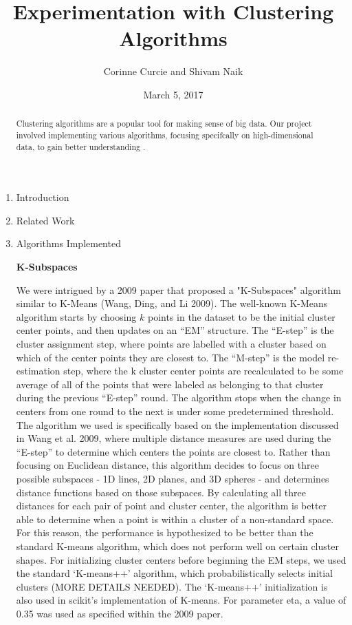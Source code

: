 \documentclass[12pt]{article}
\begin{document}
\title{Experimentation with Clustering Algorithms}

\author{Corinne Curcie and Shivam Naik}
\date{March 5, 2017}

\maketitle

\begin{abstract}
Clustering algorithms are a popular tool for making sense of big data. Our project involved implementing various algorithms, focusing specifcally on high-dimensional data, to gain better understanding . 
\end{abstract}


\begin{enumerate}

\item Introduction

\item Related Work

\item Algorithms Implemented

\textbf{K-Subspaces}

We were intrigued by a 2009 paper that proposed a "K-Subspaces" algorithm similar to K-Means (Wang, Ding, and Li 2009). The well-known K-Means algorithm starts by choosing $k$ points in the dataset to be the initial cluster center points, and then updates on an “EM” structure. The “E-step” is the cluster assignment step, where points are labelled with a cluster based on which of the center points they are closest to. The “M-step” is the model re-estimation step, where the k cluster center points are recalculated to be some average of all of the points that were labeled as belonging to that cluster during the previous “E-step” round. The algorithm stops when the change in centers from one round to the next is under some predetermined threshold. 
The algorithm we used is specifically based on the implementation discussed in Wang et al. 2009, where multiple distance measures are used during the “E-step” to determine which centers the points are closest to. Rather than focusing on Euclidean distance, this algorithm decides to focus on three possible subspaces - 1D lines, 2D planes, and 3D spheres - and determines distance functions based on those subspaces. By calculating all three distances for each pair of point and cluster center, the algorithm is better able to determine when a point is within a cluster of a non-standard space. For this reason, the performance is hypothesized to be better than the standard K-means algorithm, which does not perform well on certain cluster shapes. 
For initializing cluster centers before beginning the EM steps, we used the standard ‘K-means++’ algorithm, which probabilistically selects initial clusters (MORE DETAILS NEEDED). The ‘K-means++’ initialization is also used in scikit’s implementation of K-means. For parameter eta, a value of 0.35 was used as specified within the 2009 paper.


\end{enumerate}
\end{document}
